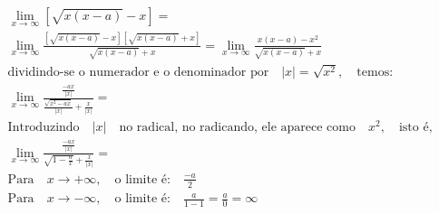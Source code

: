 \begin{ex}
\begin{align}
&\lim_{x\rightarrow \infty} [\sqrt{x(x-a)}-x]=\nonumber\\
&\lim_{x\rightarrow \infty} \frac{[\sqrt{x(x-a)}-x][\sqrt{x(x-a)}+x]}{\sqrt{x(x-a)}+x}=\lim_{x\rightarrow \infty}\frac{x(x-a)-x^2}{\sqrt{x(x-a)}+x}\nonumber\\
&\text{dividindo-se o numerador e o denominador por}\quad\left|x\right|=\sqrt{x^2},\quad\text{temos:}\nonumber\\
&\lim_{x\rightarrow \infty} \frac{\frac{-ax}{\left|x\right|}}{\frac{\sqrt{x^2-ax}}{\left|x\right|}+\frac{x}{\left|x\right|}}=\nonumber\\
&\text{Introduzindo}\quad\left|x\right|\quad\text{no radical, no radicando, ele aparece como}\quad{x^2},\quad\text{isto é,}\nonumber\\
&\lim_{x\rightarrow \infty} \frac{\frac{-ax}{\left|x\right|}}{{\sqrt{1-\frac{a}{x}}}+\frac{x}{\left|x\right|}}=\nonumber\\
&\text{Para}\quad{x\rightarrow +\infty},\quad\text{o limite é:}\quad{\frac{-a}{2}}\nonumber\\
&\text{Para}\quad{x\rightarrow -\infty},\quad\text{o limite é:}\quad{\frac{a}{1-1}=\frac{a}{0}}=\infty\nonumber
\end{align}
\end{ex}
